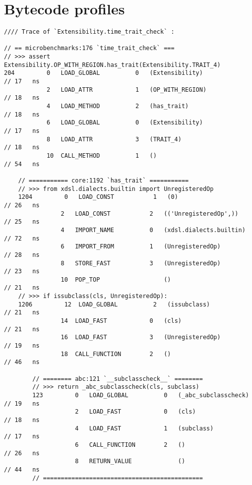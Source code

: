 \chapter{Bytecode profiles}
\label{chap:bytecode-profiles}

\begin{code}
    \begin{verbatim}
//// Trace of `Extensibility.time_trait_check` :

// == microbenchmarks:176 `time_trait_check` ===
// >>> assert Extensibility.OP_WITH_REGION.has_trait(Extensibility.TRAIT_4)
204         0   LOAD_GLOBAL          0   (Extensibility)                                    // 17   ns
            2   LOAD_ATTR            1   (OP_WITH_REGION)                                   // 18   ns
            4   LOAD_METHOD          2   (has_trait)                                        // 18   ns
            6   LOAD_GLOBAL          0   (Extensibility)                                    // 17   ns
            8   LOAD_ATTR            3   (TRAIT_4)                                          // 18   ns
            10  CALL_METHOD          1   ()                                                 // 54   ns

    // =========== core:1192 `has_trait` ===========
    // >>> from xdsl.dialects.builtin import UnregisteredOp
    1204         0   LOAD_CONST           1   (0)                                           // 26   ns
                2   LOAD_CONST           2   (('UnregisteredOp',))                          // 25   ns
                4   IMPORT_NAME          0   (xdsl.dialects.builtin)                        // 72   ns
                6   IMPORT_FROM          1   (UnregisteredOp)                               // 28   ns
                8   STORE_FAST           3   (UnregisteredOp)                               // 23   ns
                10  POP_TOP                  ()                                             // 21   ns
    // >>> if issubclass(cls, UnregisteredOp):
    1206         12  LOAD_GLOBAL          2   (issubclass)                                  // 21   ns
                14  LOAD_FAST            0   (cls)                                          // 21   ns
                16  LOAD_FAST            3   (UnregisteredOp)                               // 19   ns
                18  CALL_FUNCTION        2   ()                                             // 46   ns

        // ======== abc:121 `__subclasscheck__` ========
        // >>> return _abc_subclasscheck(cls, subclass)
        123         0   LOAD_GLOBAL          0   (_abc_subclasscheck)                       // 19   ns
                    2   LOAD_FAST            0   (cls)                                      // 18   ns
                    4   LOAD_FAST            1   (subclass)                                 // 17   ns
                    6   CALL_FUNCTION        2   ()                                         // 26   ns
                    8   RETURN_VALUE             ()                                         // 44   ns
        // =============================================


\end{verbatim}
\end{code}
